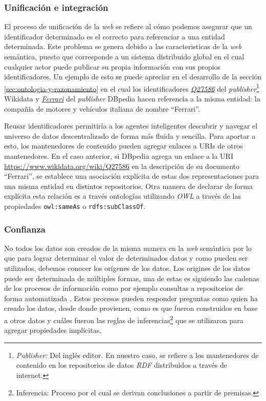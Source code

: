 \subsubsection{Unificación e integración}

El proceso de unificación de la \textit{web} se refiere al cómo podemos asegurar
que un identificador determinado es el correcto para referenciar a una entidad
determinada. Este problema se genera debido a las caracteristicas de la
\textit{web} semántica, puesto que corresponde a un sistema distribuido global
en el cual cualquier actor puede publicar su propia información con sus propios
identificadores. Un ejemplo de esto se puede apreciar en el desarrollo de la
sección \ref{sec:ontologia-y-razonamiento} en el cual los identificadores
\href{https://www.wikidata.org/wiki/Q27586}{\textit{Q27586}} del
\textit{publisher}\footnote{\textit{Publisher:} Del inglés editor. En nuestro
caso, se refiere a los mantenedores de contenido en los repositorios de datos
\textit{RDF} distribuidos a través de internet.} Wikidata y
\href{http://dbpedia.org/page/Ferrari}{\textit{Ferrari}} del \textit{publisher}
DBpedia hacen referencia a la misma entidad: la compañía de motores y
vehículos italiana de nombre ``Ferrari''.

Reusar identificadores permitiría a los agentes inteligentes descubrir y navegar
el universo de datos descentralizado de forma más fluida y sencilla. Para
aportar a esto, los mantenedores de contenido pueden agregar enlaces a URIs de
otros mantenedores. En el caso anterior, si DBpedia agrega un enlace a la URI
\url{https://www.wikidata.org/wiki/Q27586} en la descripción de su documento
``Ferrari'', se establece una asociación explícita de estas dos representaciones
para una misma entidad en distintos repositorios. Otra manera de declarar de
forma explícita esta relación es a través ontologías utilizando \textit{OWL} a
través de las propiedades \texttt{owl:sameAs} o \texttt{rdfs:subClassOf}.

\subsubsection{Confianza}

No todos los datos son creados de la misma manera en la \textit{web} semántica
por lo que para lograr determinar el valor de determinados datos y como pueden
ser utilizados, debemos conocer los orígenes de los datos. Los origines de los
datos puede ser determinada de múltiples formas, una de estas es siguiendo las
cadenas de los procesos de información como por ejemplo consultas a repositorios
de forma automatizada \cite{dividino2009querying} \cite{flouris2009coloring}.
Estos procesos pueden responder preguntas como quien ha creado los datos, desde
donde provienen, como es que fueron construidos en base a otros datos y cuáles
fueron las reglas de inferencias\footnote{Inferencia: Proceso por el cual se
derivan conclusiones a partir de premisas.} que se utilizaron para agregar
propiedades implícitas.

